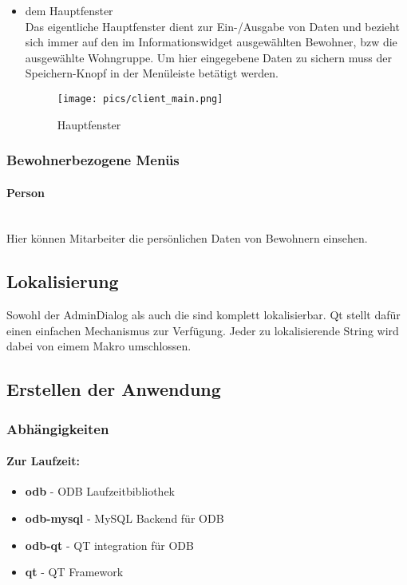 \begin{itemize}
\begin{figure*}[h]
\begin{center}
		\end{center}
	\end{figure*}
	\FloatBarrier
	\item dem Hauptfenster\mbox{}\\
	\noindent
	Das eigentliche Hauptfenster dient zur Ein-/Ausgabe von Daten und bezieht sich immer auf den im Informationswidget ausgewählten Bewohner, bzw die ausgewählte Wohngruppe. Um hier eingegebene Daten zu sichern muss der Speichern-Knopf in der Menüleiste betätigt werden.\\
	\begin{figure*}[h]
		\begin{center}
			\texttt{[image: pics/client\_main.png]}
			\caption{Hauptfenster}
		\end{center}
	\end{figure*}
	\FloatBarrier
\end{itemize}
\subsubsection{Bewohnerbezogene Menüs}
\paragraph{Person}\mbox{}\\
Hier können Mitarbeiter die persönlichen Daten von Bewohnern einsehen.
\subsection{Lokalisierung}
Sowohl der AdminDialog als auch die \EBP sind komplett lokalisierbar. Qt stellt dafür einen einfachen Mechanismus zur Verfügung. Jeder zu lokalisierende String wird dabei von eimem Makro umschlossen.

\newpage

\subsection{Erstellen der Anwendung}
\subsubsection{Abhängigkeiten}
\paragraph{Zur Laufzeit:}
\begin{itemize}
	\item \textbf{odb} - ODB Laufzeitbibliothek
	\item \textbf{odb-mysql} - MySQL Backend für ODB
	\item \textbf{odb-qt} - QT integration für ODB
	\item \textbf{qt} - QT Framework
\end{itemize}

